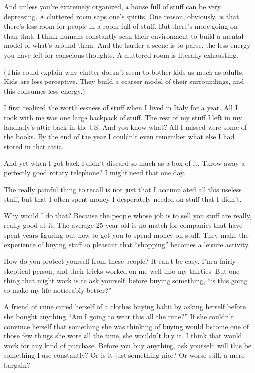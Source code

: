And unless you're extremely organized, a house full of stuff can be very
depressing. A cluttered room saps one's spirits. One reason, obviously,
is that there's less room for people in a room full of stuff. But
there's more going on than that. I think humans constantly scan their
environment to build a mental model of what's around them. And the
harder a scene is to parse, the less energy you have left for conscious
thoughts. A cluttered room is literally exhausting.

(This could explain why clutter doesn't seem to bother kids as much as
adults. Kids are less perceptive. They build a coarser model of their
surroundings, and this consumes less energy.)

I first realized the worthlessness of stuff when I lived in Italy for a
year. All I took with me was one large backpack of stuff. The rest of my
stuff I left in my landlady's attic back in the US. And you know what?
All I missed were some of the books. By the end of the year I couldn't
even remember what else I had stored in that attic.

And yet when I got back I didn't discard so much as a box of it. Throw
away a perfectly good rotary telephone? I might need that one day.

The really painful thing to recall is not just that I accumulated all
this useless stuff, but that I often spent money I desperately needed on
stuff that I didn't.

Why would I do that? Because the people whose job is to sell you stuff
are really, really good at it. The average 25 year old is no match for
companies that have spent years figuring out how to get you to spend
money on stuff. They make the experience of buying stuff so pleasant
that ``shopping'' becomes a leisure activity.

How do you protect yourself from these people? It can't be easy. I'm a
fairly skeptical person, and their tricks worked on me well into my
thirties. But one thing that might work is to ask yourself, before
buying something, ``is this going to make my life noticeably better?''

A friend of mine cured herself of a clothes buying habit by asking
herself before she bought anything ``Am I going to wear this all the
time?'' If she couldn't convince herself that something she was thinking
of buying would become one of those few things she wore all the time,
she wouldn't buy it. I think that would work for any kind of purchase.
Before you buy anything, ask yourself: will this be something I use
constantly? Or is it just something nice? Or worse still, a mere
bargain?

